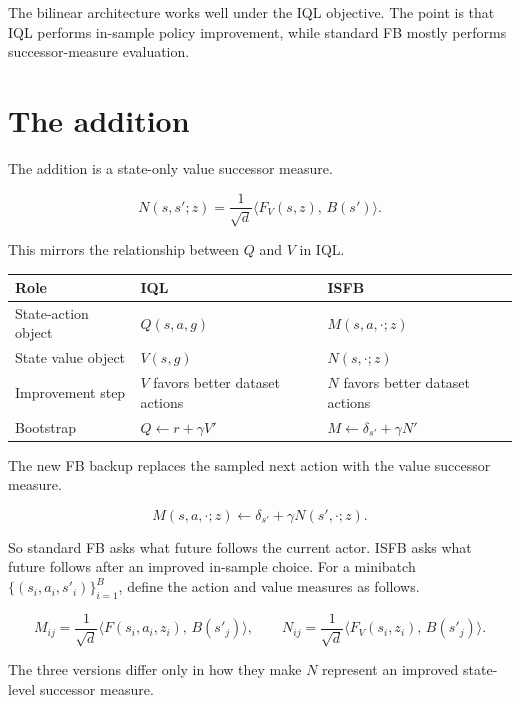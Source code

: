 \documentclass[11pt]{article}
\newcommand{\inner}[2]{\langle #1,\, #2\rangle}
\newcommand{\Fmap}{F}
\newcommand{\Vmap}{F_V}
\newcommand{\Bmap}{B}
\begin{document}
The bilinear architecture works well under the IQL objective.
The point is that IQL performs in-sample policy improvement, while standard FB mostly performs successor-measure evaluation.

\section{The addition}

The addition is a state-only value successor measure.

\begin{equation}
N(s,s';z)=\frac{1}{\sqrt d}\inner{\Vmap(s,z)}{\Bmap(s')}.
\end{equation}

This mirrors the relationship between $Q$ and $V$ in IQL.

\begin{center}
\begin{tabular}{@{}lll@{}}
\toprule
\textbf{Role} & \textbf{IQL} & \textbf{ISFB} \\
\midrule
State-action object & $Q(s,a,g)$ & $M(s,a,\cdot;z)$ \\
State value object & $V(s,g)$ & $N(s,\cdot;z)$ \\
Improvement step & $V$ favors better dataset actions & $N$ favors better dataset actions \\
Bootstrap & $Q\leftarrow r+\gamma V'$ & $M\leftarrow \delta_{s'}+\gamma N'$ \\
\bottomrule
\end{tabular}
\end{center}

The new FB backup replaces the sampled next action with the value successor measure.

\begin{equation}
M(s,a,\cdot;z)\leftarrow \delta_{s'}+\gamma N(s',\cdot;z).
\end{equation}

So standard FB asks what future follows the current actor.
ISFB asks what future follows after an improved in-sample choice.
For a minibatch $\{(s_i,a_i,s'_i)\}_{i=1}^B$, define the action and value measures as follows.

\begin{equation}
M_{ij}=\frac{1}{\sqrt d}\inner{\Fmap(s_i,a_i,z_i)}{\Bmap(s'_j)},\qquad N_{ij}=\frac{1}{\sqrt d}\inner{\Vmap(s_i,z_i)}{\Bmap(s'_j)}.
\end{equation}

The three versions differ only in how they make $N$ represent an improved state-level successor measure.
\end{document}

